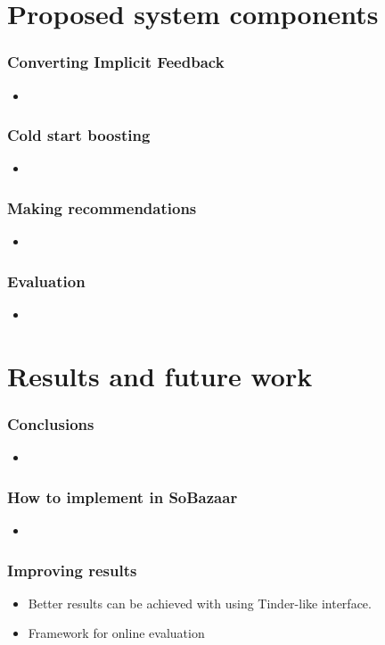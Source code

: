 \documentclass{beamer}
\begin{document}
  \section{Proposed system components}

  \begin{frame}
    \frametitle{Converting Implicit Feedback}
    \begin{itemize}
      \item
    \end{itemize}
  \end{frame}

  \begin{frame}
    \frametitle{Cold start boosting}
    \begin{itemize}
      \item
    \end{itemize}
  \end{frame}

  \begin{frame}
    \frametitle{Making recommendations}
    \begin{itemize}
      \item
    \end{itemize}
  \end{frame}

  \begin{frame}
    \frametitle{Evaluation}
    \begin{itemize}
      \item
    \end{itemize}
  \end{frame}

  \section{Results and future work}

  \begin{frame}
    \frametitle{Conclusions}
    \begin{itemize}
      \item
    \end{itemize}
  \end{frame}

  \begin{frame}
    \frametitle{How to implement in SoBazaar}
    \begin{itemize}
      \item
    \end{itemize}
  \end{frame}

  \begin{frame}
    \frametitle{Improving results}
    \begin{itemize}
      \item Better results can be achieved with using Tinder-like interface.
      \item Framework for online evaluation
    \end{itemize}
  \end{frame}
\end{document}
